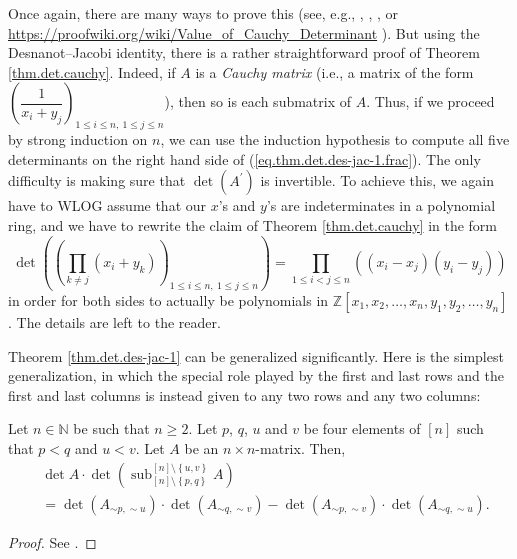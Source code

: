 Once again, there are many ways to prove this (see, e.g., \cite[Exercise
6.18]{detnotes}, \cite[\S 1.3]{Prasolov}, \cite[Theorem 2]{Gri-19.9}, or
\url{https://proofwiki.org/wiki/Value_of_Cauchy_Determinant} ). But using the
Desnanot--Jacobi identity, there is a rather straightforward proof of Theorem
\ref{thm.det.cauchy}. Indeed, if $A$ is a \emph{Cauchy matrix} (i.e., a matrix
of the form $\left(  \dfrac{1}{x_{i}+y_{j}}\right)  _{1\leq i\leq n,\ 1\leq
j\leq n}$), then so is each submatrix of $A$. Thus, if we proceed by strong
induction on $n$, we can use the induction hypothesis to compute all five
determinants on the right hand side of (\ref{eq.thm.det.des-jac-1.frac}). The
only difficulty is making sure that $\det\left(  A^{\prime}\right)  $ is
invertible. To achieve this, we again have to WLOG assume that our $x$'s and
$y$'s are indeterminates in a polynomial ring, and we have to rewrite the
claim of Theorem \ref{thm.det.cauchy} in the form%
\[
\det\left(  \left(  \prod_{k\neq j}\left(  x_{i}+y_{k}\right)  \right)
_{1\leq i\leq n,\ 1\leq j\leq n}\right)  =\prod\limits_{1\leq i<j\leq
n}\left(  \left(  x_{i}-x_{j}\right)  \left(  y_{i}-y_{j}\right)  \right)
\]
in order for both sides to actually be polynomials in $\mathbb{Z}\left[
x_{1},x_{2},\ldots,x_{n},y_{1},y_{2},\ldots,y_{n}\right]  $. The details are
left to the reader.

Theorem \ref{thm.det.des-jac-1} can be generalized significantly. Here is the
simplest generalization, in which the special role played by the first and
last rows and the first and last columns is instead given to any two rows and
any two columns:

\begin{theorem}
\label{thm.det.des-jac-2}Let $n\in\mathbb{N}$ be such that $n\geq2$. Let $p$,
$q$, $u$ and $v$ be four elements of $\left[  n\right]  $ such that $p<q$ and
$u<v$. Let $A$ be an $n\times n$-matrix. Then,%
\begin{align*}
&  \det A\cdot\det\left(  \operatorname*{sub}\nolimits_{\left[  n\right]
\setminus\left\{  p,q\right\}  }^{\left[  n\right]  \setminus\left\{
u,v\right\}  }A\right) \\
&  =\det\left(  A_{\sim p,\sim u}\right)  \cdot\det\left(  A_{\sim q,\sim
v}\right)  -\det\left(  A_{\sim p,\sim v}\right)  \cdot\det\left(  A_{\sim
q,\sim u}\right)  .
\end{align*}

\end{theorem}

\begin{proof}
See \cite[Theorem 6.126]{detnotes}.
\end{proof}


